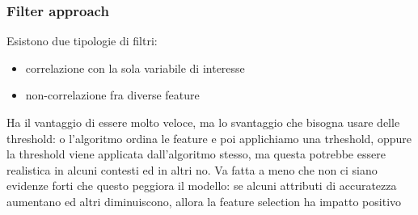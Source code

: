 \documentclass{article}
\begin{document}
\subsubsection{Filter approach}
Esistono due tipologie di filtri:
\begin{itemize}
\item correlazione con la sola variabile di interesse
\item non-correlazione fra diverse feature
\end{itemize}
Ha il vantaggio di essere molto veloce, ma lo svantaggio che bisogna usare delle threshold: o l'algoritmo ordina le feature e poi applichiamo una trheshold, oppure la threshold viene applicata dall'algoritmo stesso, ma questa potrebbe essere realistica in alcuni contesti ed in altri no. Va fatta a meno che non ci siano evidenze forti che questo peggiora il modello: se alcuni attributi di accuratezza aumentano ed altri diminuiscono, allora la feature selection ha impatto positivo
\end{document}

